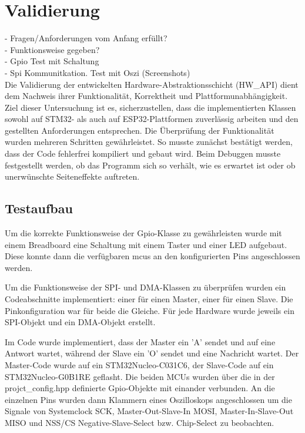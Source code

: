 \section{Validierung}

- Fragen/Anforderungen vom Anfang erfüllt?\\

- Funktionsweise gegeben?\\
- Gpio Test mit Schaltung\\
- Spi Kommunitkation. Test mit Oszi (Screenshots)\\


Die Validierung der entwickelten Hardware-Abstraktionsschicht (HW\_API) dient dem Nachweis ihrer Funktionalität, Korrektheit und Plattformunabhängigkeit. 
Ziel dieser Untersuchung ist es, sicherzustellen, dass die implementierten Klassen sowohl auf STM32- als auch auf ESP32-Plattformen zuverlässig arbeiten und den gestellten Anforderungen entsprechen.
Die Überprüfung der Funktionalität wurden mehreren Schritten gewährleistet.
So musste zunächst bestätigt werden, dass der Code fehlerfrei kompiliert und gebaut wird.
Beim Debuggen musste festgestellt werden, ob das Programm sich so verhält, wie es erwartet ist oder ob unerwünschte Seiteneffekte auftreten.

\subsection{Testaufbau}
Um die korrekte Funktionsweise der Gpio-Klasse zu gewährleisten wurde mit einem Breadboard eine Schaltung mit einem Taster und einer LED aufgebaut.
Diese konnte dann die verfügbaren \gls{mcu}s an den konfigurierten Pins angeschlossen werden.


Um die Funktionsweise der SPI- und DMA-Klassen zu überprüfen wurden ein Codeabschnitte implementiert: einer für einen Master, einer für einen Slave.
Die Pinkonfiguration war für beide die Gleiche.
Für jede Hardware wurde jeweils ein SPI-Objekt und ein DMA-Objekt erstellt.

Im Code wurde implementiert, dass der Master ein 'A' sendet und auf eine Antwort wartet, während der Slave ein 'O' sendet und eine Nachricht wartet.
Der Master-Code wurde auf ein STM32Nucleo-C031C6, der Slave-Code auf ein STM32Nucleo-G0B1RE geflasht. 
Die beiden MCUs wurden über die in der projct\_config.hpp definierte Gpio-Objekte mit einander verbunden.
An die einzelnen Pins wurden dann Klammern eines Oszilloskops angeschlossen um die Signale von Systemclock SCK, Master-Out-Slave-In MOSI, Master-In-Slave-Out MISO und NSS/CS Negative-Slave-Select bzw. Chip-Select zu beobachten. 

